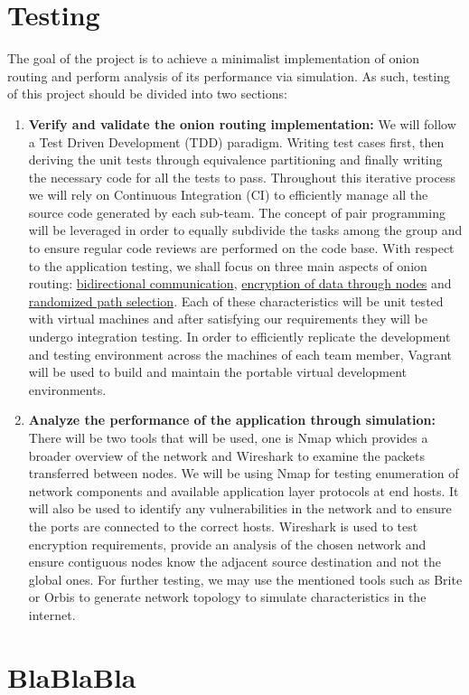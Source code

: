 \documentclass[10pt]{article}
\begin{document}
\section*{Testing}
The goal of the project is to achieve a minimalist implementation of onion
routing and perform analysis of its performance via simulation. As such,
testing of this project should be divided into two sections:
\begin{enumerate}
	\item \textbf{Verify and validate the onion routing implementation:} We
		will follow a Test Driven Development (TDD) paradigm. Writing test
		cases first, then deriving the unit tests through equivalence
		partitioning and finally writing the necessary code for all the tests
		to pass. Throughout this iterative process we will rely on Continuous
		Integration (CI) to efficiently manage all the source code generated by
		each sub-team. The concept of pair programming will be leveraged in
		order to equally subdivide the tasks among the group and to ensure
		regular code reviews are performed on the code base. With respect to
		the application testing, we shall focus on three main aspects of onion
		routing: \underline{bidirectional communication}, \underline{encryption
		of data through nodes} and \underline{randomized path selection}. Each
		of these characteristics will be unit tested with virtual machines and
		after satisfying our requirements they will be undergo integration
		testing. In order to efficiently replicate the development and testing
		environment across the machines of each team member, Vagrant will be
		used to build and maintain the portable virtual development
		environments.
	\item \textbf{Analyze the performance of the application through
		simulation:} There will be two tools that will be used, one is Nmap
		which provides a broader overview of the network and Wireshark to
		examine the packets transferred between nodes. We will be using Nmap
		for testing enumeration of network components and available application
		layer protocols at end hosts. It will also be used to identify any
		vulnerabilities in the network and to ensure the ports are connected to
		the correct hosts. Wireshark is used to test encryption requirements,
		provide an analysis of the chosen network and ensure contiguous nodes
		know the adjacent source destination and not the global ones. For
		further testing, we may use the mentioned tools such as Brite or Orbis
		to generate network topology to simulate characteristics in the
		internet.
    

\end{enumerate}


\section*{BlaBlaBla}
\end{document}
